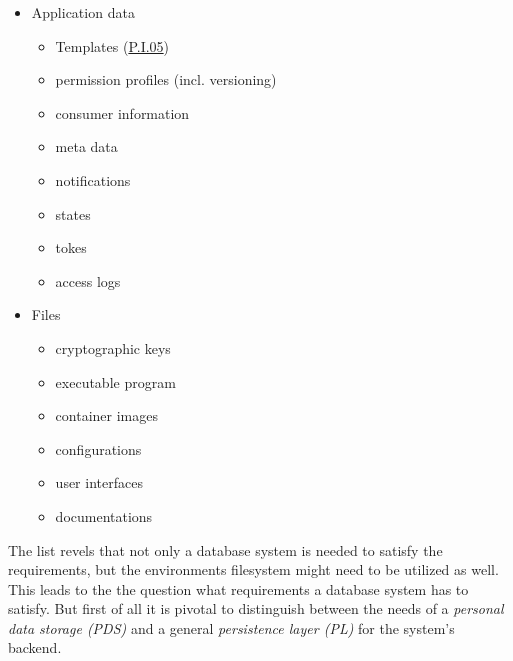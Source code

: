 \documentclass[12pt,english,a4paper,titlepage,cleardoublepage=empty,dottedtoc]{report}
\providecommand{\tightlist}{%
  \setlength{\itemsep}{0pt}\setlength{\parskip}{0pt}}
\begin{document}
\begin{itemize}
\tightlist
\item
  Application data

  \begin{itemize}
  \tightlist
  \item
    Templates (\protect\hyperlink{pi05}{P.I.05})
  \item
    permission profiles (incl. versioning)
  \item
    consumer information
  \item
    meta data
  \item
    notifications
  \item
    states
  \item
    tokes
  \item
    access logs
  \end{itemize}
\item
  Files

  \begin{itemize}
  \tightlist
  \item
    cryptographic keys
  \item
    executable program
  \item
    container images
  \item
    configurations
  \item
    user interfaces
  \item
    documentations
  \end{itemize}
\end{itemize}

The list revels that not only a database system is needed to satisfy the
requirements, but the environments filesystem might need to be utilized
as well. This leads to the the question what requirements a database
system has to satisfy. But first of all it is pivotal to distinguish
between the needs of a \emph{personal data storage (PDS)} and a general
\emph{persistence layer (PL)} for the system's backend.
\end{document}

